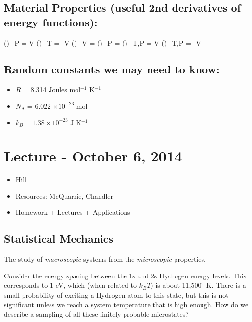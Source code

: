 \documentclass[12pt]{article}
\begin{document}
\subsection{Material Properties (useful 2nd derivatives of energy functions):}
\eqs
{} \left(\right)_P = V \alpha
\eqe
\eqs
{} \left(\right)_T = -V \beta
\eqe
\eqs
{} \left(\right)_V = 
\eqe
\eqs
{} \left(\right)_P = 
\eqe
\eqs
{} \left(\right)_{T,P} = V \gamma
\eqe
\eqs
{} \left(\right)_{T,P} = -V \chi
\eqe

\subsection{Random constants we may need to know:}
\begin{itemize}
\item $R$ = 8.314 Joules mol$^{-1}$ K$^{-1}$
\item $N_\text{A}$ = 6.022 $\times 10^{-23}$ mol
\item $k_B = 1.38 \times 10^{-23}$ J K$^{-1}$


\end{itemize}


\section{Lecture - October 6, 2014}
\begin{itemize}
\item {} Hill
\item Resources: McQuarrie, Chandler
\item Homework + Lectures + Applications
\end{itemize}
\subsection{Statistical Mechanics}
The study of \emph{macroscopic} systems from the \emph{microscopic} properties.

Consider the energy spacing between the 1s and 2s Hydrogen energy levels.  This corresponds to $1$ eV, which (when related to $k_B T$) is about 11,500$^0$ K.  There is a small probability of exciting a Hydrogen atom to this state, but this is not significant unless we reach a system temperature that is high enough.  How do we describe a sampling of all these finitely probable microstates?
\end{document}
